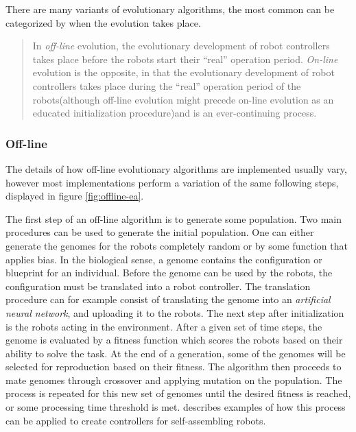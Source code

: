 There are many variants of evolutionary algorithms, the most common can be categorized by when the evolution takes place\cite{eiben_embodied_2010}.
\begin{quote} 
	In \emph{off-line} evolution, the evolutionary development of robot controllers takes place before the robots start their “real” operation period.
	\emph{On-line} evolution is the opposite, in that the evolutionary development of robot controllers takes place during the “real” operation period of the robots(although off-line evolution might precede on-line evolution as an educated initialization procedure)and is an ever-continuing process.\cite{eiben_embodied_2010}
\end{quote}


\subsubsection*{Off-line}
The details of how off-line evolutionary algorithms are implemented usually vary, however most implementations perform a variation of the same following steps\cite{doncieux_evolutionary_2011}, displayed in figure \ref{fig:offline-ea}. 

The first step of an off-line algorithm is to generate some population.
Two main procedures can be used to generate the initial population.     
One can either generate the genomes for the robots completely random or by some function that applies bias.
In the biological sense, a genome contains the configuration or blueprint for an individual.
Before the genome can be used by the robots, the configuration must be translated into a robot controller.
The translation procedure can for example consist of translating the genome into an \emph{artificial neural network}, and uploading it to the robots.
The next step after initialization is the robots acting in the environment.
After a given set of time steps, the genome is evaluated by a fitness function which scores the robots based on their ability to solve the task.     
At the end of a generation, some of the genomes will be selected for reproduction based on their fitness.     
The algorithm then proceeds to mate genomes through crossover and applying mutation on the population.     
The process is repeated for this new set of genomes until the desired fitness is reached, or some processing time threshold is met.
\cite{trianni_evolving_2004, li_co-evolution_2015} describes examples of how this process can be applied to create controllers for self-assembling robots. 

